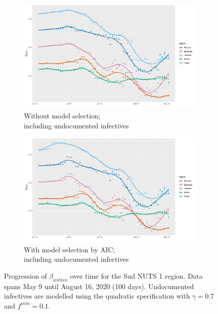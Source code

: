 \documentclass[12pt]{article}
\begin{document}
\begin{appendices}
\begin{figure}[H]
\begin{subfigure}{\textwidth}
    	      \includegraphics[width=0.92\linewidth]{output/model_within_lag14_betawithin_Sud_UndocQuadratic_rolling.pdf}
    	      \caption{Without model selection; \\ including undocumented infectives}
    	      \label{fig:beta_within_over_time_sud_regular_undoc}
    	    \end{subfigure}\newline
    	    \begin{subfigure}{\textwidth}
    	      \centering
    	      \includegraphics[width=0.92\linewidth]{output/model_within_lag14_betawithin_Sud_aic_UndocQuadratic_rolling.pdf}
    	      \caption{With model selection by AIC; \\ including undocumented infectives}
    	      \label{fig:beta_within_over_time_sud_aic_undoc}
    	    \end{subfigure}
    	    \caption{Progression of $\beta_{within}$ over time for the Sud NUTS 1 region. Data spans May 9 until August 16, 2020 (100 days). Undocumented infectives are modelled using the quadratic specification with $\gamma = 0.7$ and $f^{min}=0.1$.}
    	    \label{fig:beta_within_over_time_sud}
	    \end{figure}
		

\end{appendices}
\end{document}
